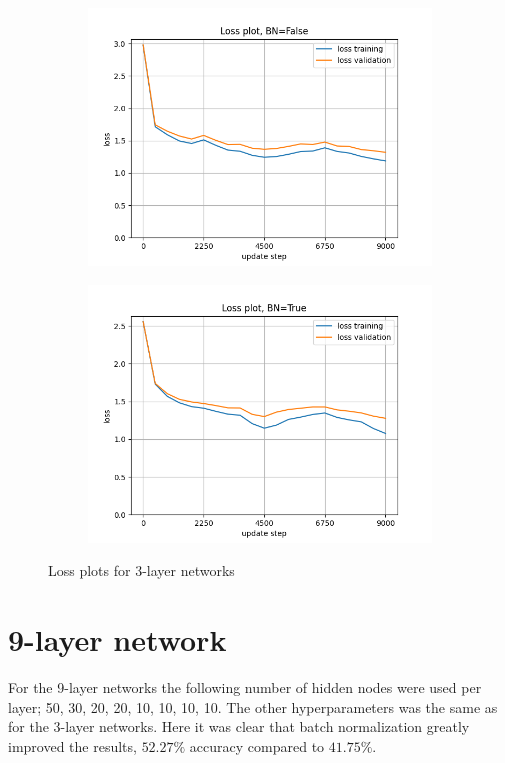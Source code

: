 \documentclass[12pt, a4paper]{article}
\begin{document}
\begin{figure}[H]
    \centering
    \begin{subfigure}{0.45\textwidth}
        \centering
        \includegraphics[width=\textwidth]{results/2-2250-3-loss-False.png}
    \end{subfigure}
    \hfill
    \begin{subfigure}{0.45\textwidth}
        \centering
        \includegraphics[width=\textwidth]{results/2-2250-3-loss-True.png}
    \end{subfigure}
    \caption{Loss plots for 3-layer networks}
    \label{fig:3-layer}
\end{figure}
\section{9-layer network}
For the 9-layer networks the following number of hidden nodes were used per layer; 50, 30, 20, 20, 10, 10, 10, 10. The other hyperparameters was the same as for the 3-layer networks. Here it was clear that batch normalization greatly improved the results,  $52.27\%$ accuracy compared to $41.75\%$.
\end{document}
